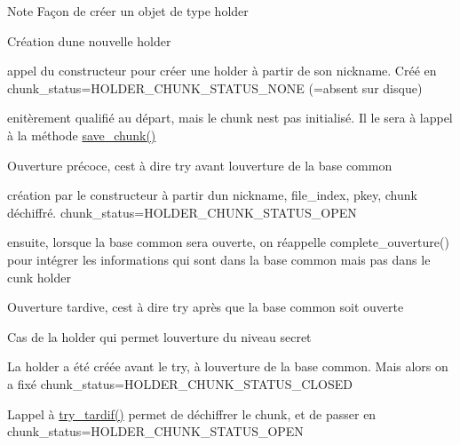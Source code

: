 \begin{DoxyNote}{Note}
Façon de créer un objet de type holder
\begin{DoxyItemize}
\item Création d\textquotesingle{}une nouvelle holder
\begin{DoxyItemize}
\item appel du constructeur pour créer une holder à partir de son nickname. Créé en chunk\+\_\+status=H\+O\+L\+D\+E\+R\+\_\+\+C\+H\+U\+N\+K\+\_\+\+S\+T\+A\+T\+U\+S\+\_\+\+N\+O\+NE (=absent sur disque)
\item enitèrement qualifié au départ, mais le chunk n\textquotesingle{}est pas initialisé. Il le sera à l\textquotesingle{}appel à la méthode \hyperlink{classt__holder_a169fe1cbdec140ea60b57286f830c2c7}{save\+\_\+chunk()}
\end{DoxyItemize}
\item Ouverture précoce, c\textquotesingle{}est à dire try avant l\textquotesingle{}ouverture de la base common
\begin{DoxyItemize}
\item création par le constructeur à partir d\textquotesingle{}un nickname, file\+\_\+index, pkey, chunk déchiffré. chunk\+\_\+status=H\+O\+L\+D\+E\+R\+\_\+\+C\+H\+U\+N\+K\+\_\+\+S\+T\+A\+T\+U\+S\+\_\+\+O\+P\+EN
\item ensuite, lorsque la base common sera ouverte, on réappelle complete\+\_\+ouverture() pour intégrer les informations qui sont dans la base common mais pas dans le cunk holder
\end{DoxyItemize}
\item Ouverture tardive, c\textquotesingle{}est à dire try après que la base common soit ouverte
\begin{DoxyItemize}
\item Cas de la holder qui permet l\textquotesingle{}ouverture du niveau secret
\item La holder a été créée avant le try, à l\textquotesingle{}ouverture de la base common. Mais alors on a fixé chunk\+\_\+status=H\+O\+L\+D\+E\+R\+\_\+\+C\+H\+U\+N\+K\+\_\+\+S\+T\+A\+T\+U\+S\+\_\+\+C\+L\+O\+S\+ED
\item L\textquotesingle{}appel à \hyperlink{classt__holder_a350849be70b8ed9acd165ec1cf9e4e96}{try\+\_\+tardif()} permet de déchiffrer le chunk, et de passer en chunk\+\_\+status=H\+O\+L\+D\+E\+R\+\_\+\+C\+H\+U\+N\+K\+\_\+\+S\+T\+A\+T\+U\+S\+\_\+\+O\+P\+EN 
\end{DoxyItemize}
\end{DoxyItemize}
\end{DoxyNote}



